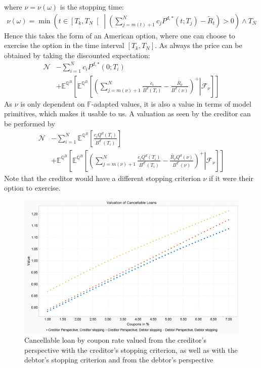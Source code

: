\documentclass[12pt]{article}
\begin{document}
	where $\nu = \nu(\omega)$ is the stopping time:
	\begin{align*}
		\nu(\omega) = \min\left(t\in \left[T_k,T_N\right[ \;\left| \;\left(\sum_{j=m(t)+1}^{N}c_jP^{d,*}(t;T_j) - \tilde{R}_t\right) > 0\right. \right) \wedge T_N
	\end{align*}
	Hence this takes the form of an American option, where one can choose to exercise the option in the time interval $\left[T_k,T_N\right]$. As always the price can be obtained by taking the discounted expectation:
	\begin{align*}
		\mathcal{N} &-\sum_{i=1}^{N}c_iP^{d,*}(0;T_i) \\ &+\mathbb{E}^{\mathbb{Q}^B}\left[\mathbb{E}^{\mathbb{Q}^B}\left[\left.\left(\sum_{j=m(\nu)+1}^{N}\frac{c_i }{B^{d}(T_i)} - \frac{\tilde{R_\nu}}{B^{d}(\nu)}\right)^+ \right| \mathcal{F}_\nu\right]\right]
	\end{align*}
	As $\nu$ is only dependent on $\mathbb{F}$-adapted values, it is also a value in terms of model primitives, which makes it usable to us.
	A valuation as seen by the creditor can be performed by
	\begin{align*}
		\mathcal{N} &- \sum_{i=1}^{N}\mathbb{E}^{\mathbb{Q}^B}\left[\frac{c_iQ^d(T_i)}{B^{d^c}(T_i)}\right] \\ &+\mathbb{E}^{\mathbb{Q}^B}\left[\mathbb{E}^{\mathbb{Q}^B}\left[\left.\left(\sum_{j=m(\nu)+1}^{N}\frac{c_i Q^d(T_i)}{B^{d^c}(T_i)} - \frac{\tilde{R_\nu}Q^d(\nu)}{B^{d^c}(\nu)}\right)^+ \right| \mathcal{F}_\nu\right]\right]
	\end{align*}
	Note that the creditor would have a different stopping criterion $\nu$ if it were their option to exercise. 
	\begin{figure}[h!]
		\centering
		\includegraphics[width=0.7\linewidth]{figures/Today/CancellableLoan_byCouponRate}
		\caption{Cancellable loan by coupon rate valued from the creditor's perspective with the creditor's stopping criterion, as well as with the debtor's stopping criterion and from the debtor's perspective}
		\label{fig:cancellableloanbycouponrate}
	\end{figure}
\end{document}
